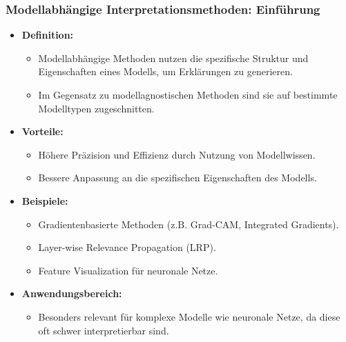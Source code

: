 \documentclass[aspectratio=1610, xcolor=dvipsnames, 9pt]{beamer}
\begin{document}
\begin{frame}
  \frametitle{Modellabhängige Interpretationsmethoden: Einführung}
  \begin{itemize}
    \item \textbf{Definition:} 
    \begin{itemize}
      \item Modellabhängige Methoden nutzen die spezifische Struktur und Eigenschaften eines Modells, um Erklärungen zu generieren.
      \item Im Gegensatz zu modellagnostischen Methoden sind sie auf bestimmte Modelltypen zugeschnitten.
    \end{itemize}
    \item \textbf{Vorteile:}
    \begin{itemize}
      \item Höhere Präzision und Effizienz durch Nutzung von Modellwissen.
      \item Bessere Anpassung an die spezifischen Eigenschaften des Modells.
    \end{itemize}
    \item \textbf{Beispiele:}
    \begin{itemize}
      \item Gradientenbasierte Methoden (z.B. Grad-CAM, Integrated Gradients).
      \item Layer-wise Relevance Propagation (LRP).
      \item Feature Visualization für neuronale Netze.
    \end{itemize}
    \item \textbf{Anwendungsbereich:}
    \begin{itemize}
      \item Besonders relevant für komplexe Modelle wie neuronale Netze, da diese oft schwer interpretierbar sind.
    \end{itemize}
  \end{itemize}
\end{frame}
\end{document}
